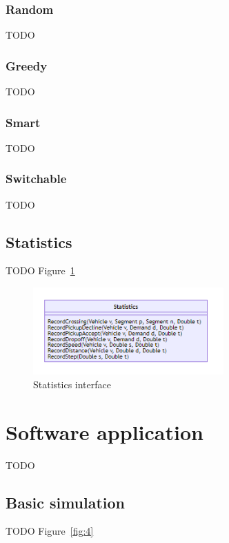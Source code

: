 \documentclass{article}
\begin{document}
    \subsubsection{Random}
    TODO
    
    \subsubsection{Greedy}
    TODO

    \subsubsection{Smart}
    TODO

    \subsubsection{Switchable}
    TODO

    \subsection{Statistics}
    TODO Figure~\ref{fig:3}

    \begin{figure}
        \centering
        \includegraphics[width=0.65\textwidth]{../../diagrams/statistics/classes.png}
        \caption{Statistics interface}
        \label{fig:3}
    \end{figure}

    \section{Software application}
    \label{sec:app}
    TODO

    \subsection{Basic simulation}
    TODO Figure~\ref{fig:4}
\end{document}
